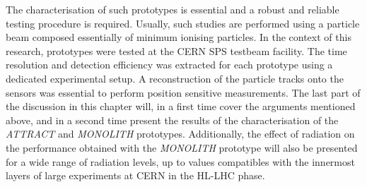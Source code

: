 The characterisation of such prototypes is essential and a robust and reliable testing procedure is required. Usually, such studies are performed using a particle beam composed essentially of minimum ionising particles. In the context of this research, prototypes were tested at the CERN SPS testbeam facility. The time resolution and detection efficiency was extracted for each prototype using a dedicated experimental setup. A reconstruction of the particle tracks onto the sensors was essential to perform position sensitive measurements. The last part of the discussion in this chapter will, in a first time cover the arguments mentioned above, and in a second time present the results of the characterisation of the \textit{ATTRACT} and \textit{MONOLITH} prototypes. Additionally, the effect of radiation on the performance obtained with the \textit{MONOLITH} prototype will also be presented for a wide range of radiation levels, up to values compatibles with the innermost layers of large experiments at CERN in the HL-LHC phase.    

	\clearpage
